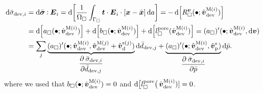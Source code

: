 \documentclass[10pt,a4paper]{article}
\newcommand{\pore}{\mathrm{pore}}
\newcommand{\ded}{\mathrm{d}}
\newcommand{\dep}{\mathrm{p}}
\begin{document}
\begin{align}
    \dif\bar{\sigma}_{\dev,i}
    & = 
    \dif\bar{\ts\sigma}\dprod \ts E_i 
    =
    \dif\left[\frac{1}{\Omega_\Box} \int_{\Gamma_\Box} \ts t \cdot \ts E_i \cdot [\ta x - \bar{\ta x}]\dif a\right]
    =
    -\dif\left[R_\Box^{\ts v}(\bullet;\hat{\ts v}_\dev^{\macro(i)})\right]
\nonumber\\
    &=
    \dif\left[a_\Box(\bullet; \hat{\ta{v}}^{\macro(i)}_\dev)\right] + \dif\left[b_\Box(\bullet; \hat{\ta{v}}^{\macro(i)}_\dev)\right] + \dif\left[l_\Box^\pore(\hat{\ta{v}}^{\macro(i)}_\dev)\right] = (a_\Box)'(\bullet; \hat{\ta{v}}^{\macro(i)}_\dev,\dif\ta{v})
    \nonumber \\
    & = 
    \sum_{j}
    \underbrace{(a_\Box)'(\bullet;\hat{\ta{v}}^{\macro(i)}_\dev,\hat{\ta{v}}^{\macro(j)}_\dev +
    \hat{\ta{v}}^{\fluct(j)}_\ded)}_{\displaystyle \pd{\bar{\sigma}_{\dev,i}}{\bar{d}_{\dev,j}}}
    \dif\bar{d}_{\dev,j}
    + \underbrace{(a_\Box)'(\bullet;\hat{\ta{v}}^{\macro(i)}_\dev, \hat{\ta{v}}^{\fluct}_\dep)}_{\displaystyle \pd{\bar{\sigma}_{\dev,i} }{ \bar{p} } }
    \dif\bar{p}.
    \label{eq219}
\end{align}
where we used that $b_\Box(\bullet;\hat{\boldsymbol{v}}_{\mathrm{dev}}^{\mathrm{M}(i)}) = 0$ and $\dif\left[l_\Box^\pore\right(\hat{\ta v}^{\macro(i)}_\dev)] = 0$.
\end{document}
